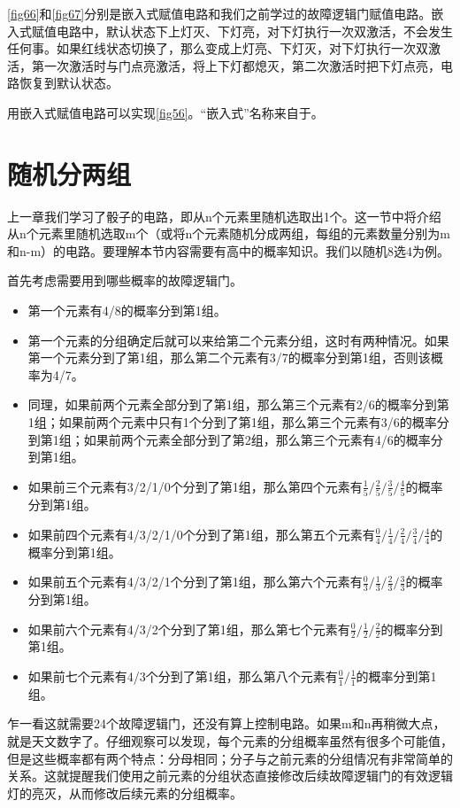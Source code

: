 \autoref{fig66}和\autoref{fig67}分别是嵌入式赋值电路和我们之前学过的故障逻辑门赋值电路。嵌入式赋值电路中，默认状态下上灯灭、下灯亮，对下灯执行一次双激活，不会发生任何事。如果红线状态切换了，那么变成上灯亮、下灯灭，对下灯执行一次双激活，第一次激活时与门点亮激活，将上下灯都熄灭，第二次激活时把下灯点亮，电路恢复到默认状态。

用嵌入式赋值电路可以实现\autoref{fig56}。“嵌入式”名称来自于。

\section{随机分两组}\label{sec36}

上一章我们学习了骰子的电路，即从n个元素里随机选取出1个。这一节中将介绍从n个元素里随机选取m个（或将n个元素随机分成两组，每组的元素数量分别为m和n-m）的电路。要理解本节内容需要有高中的概率知识。我们以随机8选4为例。

首先考虑需要用到哪些概率的故障逻辑门。
\begin{itemize}
  \item 第一个元素有4/8的概率分到第1组。
  \item 第一个元素的分组确定后就可以来给第二个元素分组，这时有两种情况。如果第一个元素分到了第1组，那么第二个元素有3/7的概率分到第1组，否则该概率为4/7。
  \item 同理，如果前两个元素全部分到了第1组，那么第三个元素有2/6的概率分到第1组；如果前两个元素中只有1个分到了第1组，那么第三个元素有3/6的概率分到第1组；如果前两个元素全部分到了第2组，那么第三个元素有4/6的概率分到第1组。
  \item 如果前三个元素有3/2/1/0个分到了第1组，那么第四个元素有$\frac{1}{5}/\frac{2}{5}/\frac{3}{5}/\frac{4}{5}$的概率分到第1组。
  \item 如果前四个元素有4/3/2/1/0个分到了第1组，那么第五个元素有$\frac{0}{4}/\frac{1}{4}/\frac{2}{4}/\frac{3}{4}/\frac{4}{4}$的概率分到第1组。
  \item 如果前五个元素有4/3/2/1个分到了第1组，那么第六个元素有$\frac{0}{3}/\frac{1}{3}/\frac{2}{3}/\frac{3}{3}$的概率分到第1组。
  \item 如果前六个元素有4/3/2个分到了第1组，那么第七个元素有$\frac{0}{2}/\frac{1}{2}/\frac{2}{2}$的概率分到第1组。
  \item 如果前七个元素有4/3个分到了第1组，那么第八个元素有$\frac{0}{1}/\frac{1}{1}$的概率分到第1组。
\end{itemize}

乍一看这就需要24个故障逻辑门，还没有算上控制电路。如果m和n再稍微大点，就是天文数字了。仔细观察可以发现，每个元素的分组概率虽然有很多个可能值，但是这些概率都有两个特点：分母相同；分子与之前元素的分组情况有非常简单的关系。这就提醒我们使用之前元素的分组状态直接修改后续故障逻辑门的有效逻辑灯的亮灭，从而修改后续元素的分组概率。

